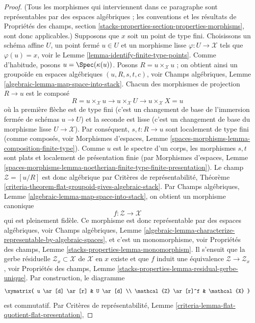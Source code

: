 \begin{proof}
(Tous les morphismes qui interviennent dans ce paragraphe sont représentables
par des espaces algébriques ; les conventions et les résultats de
Propriétés des champs,
section \ref{stacks-properties-section-properties-morphisms},
sont donc applicables.)
Supposons que $x$ soit un point de type fini. Choisissons un schéma affine
$U$, un point fermé $u \in U$ et un morphisme lisse
$\varphi : U \to \mathcal{X}$ tels que $\varphi(u) = x$, voir le
Lemme \ref{lemma-identify-finite-type-points}.
Comme d'habitude, posons $u = \Spec(\kappa(u))$. Posons
$R = u \times_\mathcal{X} u$ ; on obtient ainsi un groupoïde en espaces
algébriques $(u, R, s, t, c)$, voir Champs algébriques,
Lemme \ref{algebraic-lemma-map-space-into-stack}.
Chacun des morphismes de projection $R \to u$ est le composé
$$
R = u \times_\mathcal{X} u \to
u \times_\mathcal{X} U \to
u \times_\mathcal{X} X = u
$$
où la première flèche est de type fini (c'est un changement de base de
l'immersion fermée de schémas $u \to U$) et la seconde est lisse (c'est un
changement de base du morphisme lisse $U \to \mathcal{X}$). Par conséquent,
$s, t : R \to u$ sont localement de type fini (comme composés, voir
Morphismes d'espaces,
Lemme \ref{spaces-morphisms-lemma-composition-finite-type}).
Comme $u$ est le spectre d'un corps, les morphismes $s, t$ sont plats et localement de
présentation finie (par Morphismes d'espaces, Lemme
\ref{spaces-morphisms-lemma-noetherian-finite-type-finite-presentation}).
Le champ $\mathcal{Z} = [u/R]$ est donc algébrique par Critères de
représentabilité,
Théorème \ref{criteria-theorem-flat-groupoid-gives-algebraic-stack}.
Par Champs algébriques,
Lemme \ref{algebraic-lemma-map-space-into-stack},
on obtient un morphisme canonique
$$
f : \mathcal{Z} \longrightarrow \mathcal{X}
$$
qui est pleinement fidèle. Ce morphisme est donc représentable par des espaces
algébriques, voir Champs algébriques, Lemme
\ref{algebraic-lemma-characterize-representable-by-algebraic-spaces},
et c'est un monomorphisme, voir Propriétés des champs,
Lemme \ref{stacks-properties-lemma-monomorphism}.
Il s'ensuit que la gerbe résiduelle
$\mathcal{Z}_x \subset \mathcal{X}$ de $\mathcal{X}$ en $x$ existe et que
$f$ induit une équivalence $\mathcal{Z} \to \mathcal{Z}_x$, voir
Propriétés des champs,
Lemme \ref{stacks-properties-lemma-residual-gerbe-unique}.
Par construction, le diagramme
$$
\xymatrix{
u \ar[d] \ar[r] & U \ar[d] \\
\mathcal{Z} \ar[r]^f & \mathcal{X}
}
$$
est commutatif. Par Critères de représentabilité,
Lemme \ref{criteria-lemma-flat-quotient-flat-presentation},

\end{proof}
